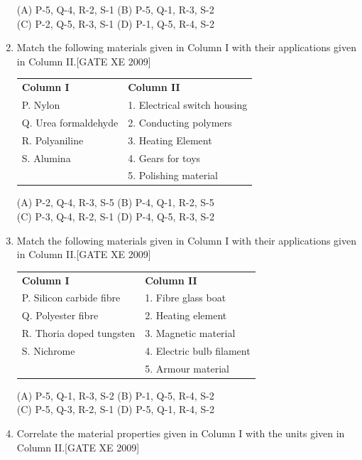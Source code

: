 \documentclass[journal,12pt,onecolumn]{IEEEtran}
\theoremstyle{remark}
\begin{document}
\begin{enumerate}
\noindent
(A) P-5, Q-4, R-2, S-1 \quad
(B) P-5, Q-1, R-3, S-2 \\
(C) P-2, Q-5, R-3, S-1 \quad
(D) P-1, Q-5, R-4, S-2
\item Match the following materials given in Column I with their applications given in Column II.\hfill[GATE XE 2009]



\begin{tabular}{p{6cm} p{6cm}}
\textbf{Column I} & \textbf{Column II} \\
P. Nylon & 1. Electrical switch housing \\
Q. Urea formaldehyde & 2. Conducting polymers \\
R. Polyaniline & 3. Heating Element \\
S. Alumina & 4. Gears for toys \\
& 5. Polishing material \\
\end{tabular}



\noindent
(A) P-2, Q-4, R-3, S-5 \hfill
(B) P-4, Q-1, R-2, S-5 \\
(C) P-3, Q-4, R-2, S-1 \hfill
(D) P-4, Q-5, R-3, S-2


\item Match the following materials given in Column I with their applications given in Column II.\hfill[GATE XE 2009]



\begin{tabular}{p{6cm} p{6cm}}
\textbf{Column I} & \textbf{Column II} \\
P. Silicon carbide fibre & 1. Fibre glass boat \\
Q. Polyester fibre & 2. Heating element \\
R. Thoria doped tungsten & 3. Magnetic material \\
S. Nichrome & 4. Electric bulb filament \\
& 5. Armour material \\
\end{tabular}



\noindent
(A) P-5, Q-1, R-3, S-2 \hfill
(B) P-1, Q-5, R-4, S-2 \\
(C) P-5, Q-3, R-2, S-1 \hfill
(D) P-5, Q-1, R-4, S-2


\item Correlate the material properties given in Column I with the units given in Column II.\hfill[GATE XE 2009]




\end{enumerate}
\end{document}
